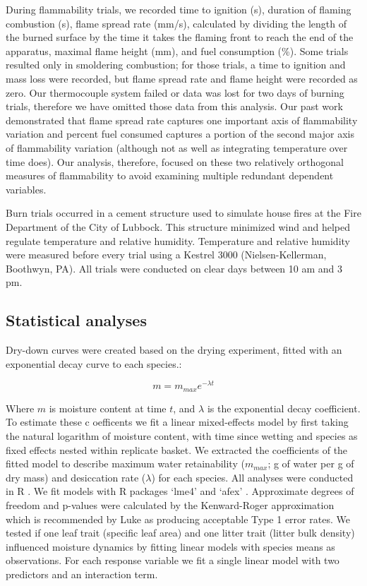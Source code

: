 \documentclass[fire,article,submit,moreauthors,pdftex]{Definitions/mdpi}
\begin{document}
During flammability trials, we recorded time to ignition (s), duration of
flaming combustion (s), flame spread rate (mm/s), calculated by dividing the
length of the burned surface by the time it takes the flaming front to reach
the end of the apparatus, maximal flame height (mm), and fuel consumption (\%).
Some trials resulted only in smoldering combustion; for those trials, a time to
ignition and mass loss were recorded, but flame spread rate and flame height
were recorded as zero. Our thermocouple system failed or data was lost for two
days of burning trials, therefore we have omitted those data from this
analysis. Our past work \cite{Magalhaes+Schwilk-2012} demonstrated that flame
spread rate captures one important axis of flammability variation
\citep{Schwilk-2015, Pausas+Keeley+etal-2017} and percent fuel consumed
captures a portion of the second major axis of flammability variation (although
not as well as integrating temperature over time does). Our analysis,
therefore, focused on these two relatively orthogonal measures of flammability
to avoid examining multiple redundant dependent variables.

Burn trials occurred in a cement structure used to simulate house fires at the
Fire Department of the City of Lubbock. This structure minimized wind and helped
regulate temperature and relative humidity. Temperature and relative humidity
were measured before every trial using a Kestrel 3000 (Nielsen-Kellerman,
Boothwyn, PA). All trials were conducted on clear days between 10 am and 3 pm.

\subsection{Statistical analyses}

Dry-down curves were created based on the drying experiment, fitted with an exponential decay curve to each species.:

\begin{equation}
m = m_{max} e^{-\lambda t}
\end{equation}

Where $m$ is moisture content at time $t$, and $\lambda$ is the exponential
decay coefficient. To estimate these c oefficents we fit a linear mixed-effects
model by first taking the natural logarithm of moisture content, with time
since wetting and species as fixed effects nested within replicate basket. We
extracted the coefficients of the fitted model to describe maximum water
retainability ($m_{max}$; g of water per g of dry mass) and desiccation rate
($\lambda$) for each species. All analyses were conducted in R
\cite{RCoreTeam-2019}. We fit models with R packages `lme4'
\cite{Bates_Machler_etal-2015} and `afex' \cite{Singmann_Bolker_etal-2017}.
Approximate degrees of freedom and p-values were calculated by the
Kenward-Roger approximation \cite{Kenward_Roger-1997} which is recommended by
Luke \cite{Luke-2017} as producing acceptable Type 1 error rates. We tested if
one leaf trait (specific leaf area) and one litter trait (litter bulk density)
influenced moisture dynamics by fitting linear models with species means as
observations. For each response variable we fit a single linear model with two
predictors and an interaction term.
\end{document}
